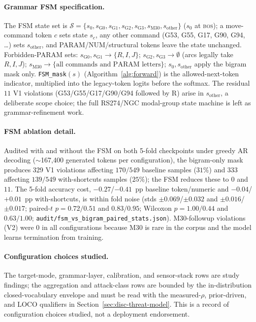 \documentclass[sensors,article,submit,moreauthors,pdftex]{Definitions/mdpi}
\begin{document}
\paragraph{Grammar FSM specification.} The FSM state set is $\mathcal{S}=\{s_0, s_{\text{G0}}, s_{\text{G1}}, s_{\text{G2}}, s_{\text{G3}}, s_{\text{M30}}, s_{\text{other}}\}$ ($s_0$ at \textsc{bos}); a move-command token $c$ sets state $s_c$, any other command (G53, G55, G17, G90, G94, \ldots) sets $s_{\text{other}}$, and PARAM/NUM/structural tokens leave the state unchanged. Forbidden-PARAM sets: $s_{\text{G0}}, s_{\text{G1}}\!\to\!\{R, I, J\}$; $s_{\text{G2}}, s_{\text{G3}}\!\to\!\emptyset$ (arcs legally take $R, I, J$); $s_{\text{M30}}\!\to\!\{\text{all commands and PARAM letters}\}$; $s_0, s_{\text{other}}$ apply the bigram mask only. \texttt{FSM\_mask}$(s)$ (Algorithm~\ref{alg:forward}) is the allowed-next-token indicator, multiplied into the legacy-token logits before the softmax. The residual $11$ V1 violations (G53/G55/G17/G90/G94 followed by R) arise in $s_{\text{other}}$, a deliberate scope choice; the full RS274/NGC modal-group state machine is left as grammar-refinement work.

\paragraph{FSM ablation detail.} Audited with and without the FSM on both 5-fold checkpoints under greedy AR decoding ($\sim$167{,}400 generated tokens per configuration), the bigram-only mask produces 329 V1 violations affecting $170/549$ baseline samples ($31\%$) and 333 affecting $139/549$ with-shortcuts samples ($25\%$); the FSM reduces these to $0$ and $11$. The 5-fold accuracy cost, $-0.27$/$-0.41$~pp baseline token/numeric and $-0.04$/$+0.01$~pp with-shortcuts, is within fold noise (stds $\pm 0.069$/$\pm 0.032$ and $\pm 0.016$/$\pm 0.017$; paired-$t$ $p=0.72/0.51$ and $0.83/0.95$; Wilcoxon $p=1.00/0.44$ and $0.63/1.00$; \texttt{audit/fsm\_vs\_bigram\_paired\_stats.json}). M30-followup violations (V2) were $0$ in all configurations because M30 is rare in the corpus and the model learns termination from training.

\paragraph{Configuration choices studied.}  The target-mode, grammar-layer, calibration, and sensor-stack rows are study findings; the aggregation and attack-class rows are bounded by the in-distribution closed-vocabulary envelope and must be read with the measured-$\rho$, prior-driven, and LOCO qualifiers in Section~\ref{sec:disc-threat-model}. This is a record of configuration choices studied, not a deployment endorsement.
\end{document}
